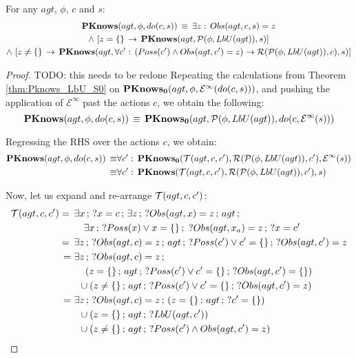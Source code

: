 \begin{lemmaext}
[{{[}{\ref{thm:Pknows_LbU_do}}]}] For any $agt$, $\phi$, $c$
and $s$:\begin{multline*}
\mathbf{PKnows}(agt,\phi,do(c,s))\,\equiv\,\exists z:\, Obs(agt,c,s)=z\\
\wedge\,\left[z=\{\}\,\rightarrow\,\mathbf{PKnows}(agt,\mathcal{P}(\phi,LbU(agt)),s)\right]\\
\wedge\,\left[z\neq\{\}\,\rightarrow\,\mathbf{PKnows}(agt,\forall c':\,\left(Poss(c')\wedge Obs(agt,c')=z\right)\rightarrow\mathcal{R}(\mathcal{P}(\phi,LbU(agt)),c),s)\right]\end{multline*}

\end{lemmaext}
\begin{proof}
TODO: this needs to be redone
Repeating the calculations from Theorem \ref{thm:Pknows_LbU_S0} on
$\mathbf{PKnows_{0}}(agt,\phi,\mathcal{E}^{\infty}(do(c,s)))$, and pushing the
application of $\mathcal{E}^{\infty}$ past the actions $c$, we obtain
the following:\[
\mathbf{PKnows}(agt,\phi,do(c,s))\,\equiv\,\mathbf{PKnows_{0}}(agt,\mathcal{P}(\phi,LbU(agt)),do(c,\mathcal{E}^{\infty}(s)))\]


Regressing the RHS over the actions $c$, we obtain:\begin{align*}
\mathbf{PKnows}(agt,\phi,do(c,s))\,\equiv & \forall c':\,\mathbf{PKnows_{0}}(\mathcal{T}(agt,c,c'),\mathcal{R}(\mathcal{P}(\phi,LbU(agt)),c'),\mathcal{E}^{\infty}(s))\\
\equiv & \forall c':\,\mathbf{PKnows}(\mathcal{T}(agt,c,c'),\mathcal{R}(\mathcal{P}(\phi,LbU(agt)),c'),s)\end{align*}


Now, let us expand and re-arrange $\mathcal{T}(agt,c,c')$:\begin{align*}
\mathcal{T}(agt,c,c')=\,\,\, & \exists x\,;\,?x=c\,;\,\exists z\,;\,?Obs(agt,x)=z\,;\, agt\,;\\
 & \,\,\,\,\,\,\exists x\,;\,?Poss(x)\vee x=\{\}\,;\,\,?Obs(agt,x_{a})=z\,;\,?x=c'\\
=\,\,\, & \exists z\,;\,?Obs(agt,c)=z\,;\, agt\,;\,?Poss(c')\vee c'=\{\}\,;\,?Obs(agt,c')=z\\
=\,\, & \exists z\,;\,?Obs(agt,c)=z\,;\\
 & \,\,\,\,\,\,\left(z=\{\}\,;\, agt\,;\,?Poss(c')\vee c'=\{\}\,;\,?Obs(agt,c')=\{\}\right)\\
 & \,\,\,\cup\left(z\neq\{\}\,;\, agt\,;\,?Poss(c')\vee c'=\{\}\,;\,?Obs(agt,c')=z\right)\\
=\,\, & \exists z\,;\,?Obs(agt,c)=z\,;\,\left(z=\{\}\,;\, agt\,;\,?c'=\{\}\right)\\
 & \,\,\,\cup\left(z=\{\}\,;\, agt\,;\,?LbU(agt,c')\right)\\
 & \,\,\,\cup\left(z\neq\{\}\,;\, agt\,;\,?Poss(c')\wedge Obs(agt,c')=z\right)\end{align*}



\end{proof}

